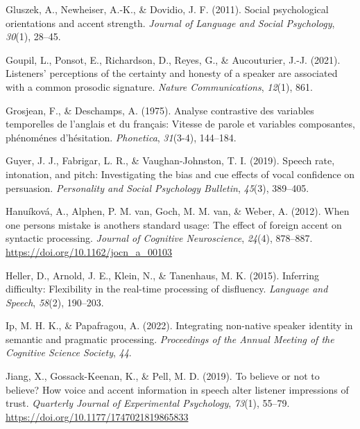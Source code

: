 \documentclass[
  man,floatsintext]{apa6}
\newlength{\cslhangindent}
\newlength{\cslentryspacingunit} %
\newenvironment{CSLReferences}[2] %
 {%
  \setlength{\parindent}{0pt}
  \ifodd #1
  \let\oldpar\par
  \def\par{\hangindent=\cslhangindent\oldpar}
  \fi
  \setlength{\parskip}{#2\cslentryspacingunit}
 }%
 {}
\begin{document}
\begin{CSLReferences}{1}{0}
\leavevmode{}%
Gluszek, A., Newheiser, A.-K., \& Dovidio, J. F. (2011). Social psychological orientations and accent strength. \emph{Journal of Language and Social Psychology}, \emph{30}(1), 28--45.

\leavevmode{}%
Goupil, L., Ponsot, E., Richardson, D., Reyes, G., \& Aucouturier, J.-J. (2021). Listeners' perceptions of the certainty and honesty of a speaker are associated with a common prosodic signature. \emph{Nature Communications}, \emph{12}(1), 861.

\leavevmode{}%
Grosjean, F., \& Deschamps, A. (1975). Analyse contrastive des variables temporelles de l'anglais et du fran{ç}ais: Vitesse de parole et variables composantes, ph{é}nom{é}nes d'h{é}sitation. \emph{Phonetica}, \emph{31}(3-4), 144--184.

\leavevmode{}%
Guyer, J. J., Fabrigar, L. R., \& Vaughan-Johnston, T. I. (2019). Speech rate, intonation, and pitch: Investigating the bias and cue effects of vocal confidence on persuasion. \emph{Personality and Social Psychology Bulletin}, \emph{45}(3), 389--405.

\leavevmode{}%
Hanuíková, A., Alphen, P. M. van, Goch, M. M. van, \& Weber, A. (2012). When one person{\textquotesingle}s mistake is another{\textquotesingle}s standard usage: The effect of foreign accent on syntactic processing. \emph{Journal of Cognitive Neuroscience}, \emph{24}(4), 878--887. \url{https://doi.org/10.1162/jocn_a_00103}

\leavevmode{}%
Heller, D., Arnold, J. E., Klein, N., \& Tanenhaus, M. K. (2015). Inferring difficulty: Flexibility in the real-time processing of disfluency. \emph{Language and Speech}, \emph{58}(2), 190--203.

\leavevmode{}%
Ip, M. H. K., \& Papafragou, A. (2022). Integrating non-native speaker identity in semantic and pragmatic processing. \emph{Proceedings of the Annual Meeting of the Cognitive Science Society}, \emph{44}.

\leavevmode{}%
Jiang, X., Gossack-Keenan, K., \& Pell, M. D. (2019). To believe or not to believe? {How voice and accent information in speech alter listener impressions of trust}. \emph{Quarterly Journal of Experimental Psychology}, \emph{73}(1), 55--79. \url{https://doi.org/10.1177/1747021819865833}


\end{CSLReferences}
\end{document}
